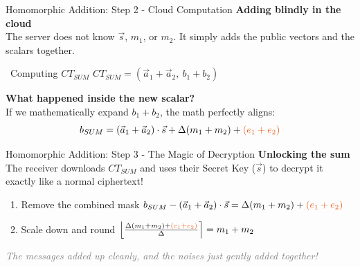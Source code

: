\documentclass[aspectratio=169, 10pt]{beamer}
\begin{document}
\begin{frame}{Homomorphic Addition: Step 2 - Cloud Computation}
    \Large
    \textbf{Adding blindly in the cloud} \\
    \vspace{0.2cm}
    \normalsize
    The server does not know $\vec{s}$, $m_1$, or $m_2$. It simply adds the public vectors and the scalars together.
    \vspace{0.3cm}
    
    \begin{exampleblock}{\faCloud \ Computing $CT_{SUM}$}
        \centering
        \vspace{0.2cm}
        \Large ${CT_{SUM}} = (\vec{a}_1 + \vec{a}_2, \ b_1 + b_2)$
        \vspace{0.2cm}
    \end{exampleblock}
    \vspace{0.3cm}
    
    \textbf{What happened inside the new scalar?} \\
    If we mathematically expand $b_1 + b_2$, the math perfectly aligns:
    \[ b_{SUM} = (\vec{a}_1 + \vec{a}_2) \cdot \vec{s} + \Delta(m_1 + m_2) + \textcolor{AccentOrange}{{(e_1 + e_2)}} \]
\end{frame}

\begin{frame}{Homomorphic Addition: Step 3 - The Magic of Decryption}
    \Large
    \textbf{Unlocking the sum} \\
    \vspace{0.2cm}
    \normalsize
    The receiver downloads $CT_{SUM}$ and uses their Secret Key ($\vec{s}$) to decrypt it exactly like a normal ciphertext!
    \vspace{0.2cm}
    
    \begin{alertblock}{\faUnlock \ 1. Remove the combined mask}
        \centering
        \vspace{0.15cm}
        \large $b_{SUM} - (\vec{a}_1 + \vec{a}_2) \cdot \vec{s} = \Delta(m_1 + m_2) + \textcolor{AccentOrange}{{(e_1 + e_2)}}$
        \vspace{0.15cm}
    \end{alertblock}
    \vspace{0.2cm}
    
    \begin{exampleblock}{\faCheckCircle \ 2. Scale down and round}
        \centering
        \vspace{0.15cm}
        \large $\left\lfloor \frac{\Delta(m_1 + m_2) + \textcolor{AccentOrange}{{(e_1 + e_2)}}}{\Delta} \right\rceil = {m_1 + m_2}$
        \vspace{0.15cm}
    \end{exampleblock}
    \vspace{0.1cm}
    \centering
    \textit{\textcolor{gray}{\small The messages added up cleanly, and the noises just gently added together!}}
\end{frame}
\end{document}
